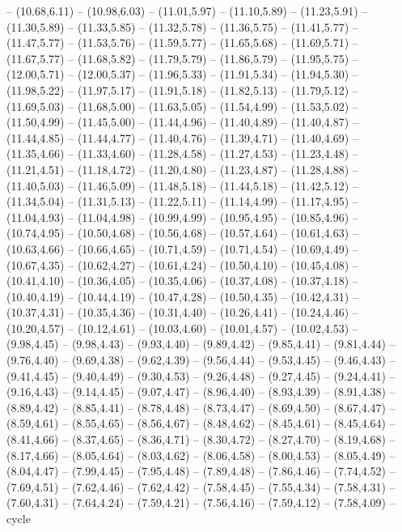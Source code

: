 {-- (10.68,6.11) -- (10.98,6.03) -- (11.01,5.97) -- (11.10,5.89) -- (11.23,5.91) -- (11.30,5.89) -- (11.33,5.85) -- (11.32,5.78) -- (11.36,5.75) -- (11.41,5.77) -- (11.47,5.77) -- (11.53,5.76) -- (11.59,5.77) -- (11.65,5.68) -- (11.69,5.71) -- (11.67,5.77) -- (11.68,5.82) -- (11.79,5.79) -- (11.86,5.79) -- (11.95,5.75) -- (12.00,5.71) -- (12.00,5.37) -- (11.96,5.33) -- (11.91,5.34) -- (11.94,5.30) -- (11.98,5.22) -- (11.97,5.17) -- (11.91,5.18) -- (11.82,5.13) -- (11.79,5.12) -- (11.69,5.03) -- (11.68,5.00) -- (11.63,5.05) -- (11.54,4.99) -- (11.53,5.02) -- (11.50,4.99) -- (11.45,5.00) -- (11.44,4.96) -- (11.40,4.89) -- (11.40,4.87) -- (11.44,4.85) -- (11.44,4.77) -- (11.40,4.76) -- (11.39,4.71) -- (11.40,4.69) -- (11.35,4.66) -- (11.33,4.60) -- (11.28,4.58) -- (11.27,4.53) -- (11.23,4.48) -- (11.21,4.51) -- (11.18,4.72) -- (11.20,4.80) -- (11.23,4.87) -- (11.28,4.88) -- (11.40,5.03) -- (11.46,5.09) -- (11.48,5.18) -- (11.44,5.18) -- (11.42,5.12) -- (11.34,5.04) -- (11.31,5.13) -- (11.22,5.11) -- (11.14,4.99) -- (11.17,4.95) -- (11.04,4.93) -- (11.04,4.98) -- (10.99,4.99) -- (10.95,4.95) -- (10.85,4.96) -- (10.74,4.95) -- (10.50,4.68) -- (10.56,4.68) -- (10.57,4.64) -- (10.61,4.63) -- (10.63,4.66) -- (10.66,4.65) -- (10.71,4.59) -- (10.71,4.54) -- (10.69,4.49) -- (10.67,4.35) -- (10.62,4.27) -- (10.61,4.24) -- (10.50,4.10) -- (10.45,4.08) -- (10.41,4.10) -- (10.36,4.05) -- (10.35,4.06) -- (10.37,4.08) -- (10.37,4.18) -- (10.40,4.19) -- (10.44,4.19) -- (10.47,4.28) -- (10.50,4.35) -- (10.42,4.31) -- (10.37,4.31) -- (10.35,4.36) -- (10.31,4.40) -- (10.26,4.41) -- (10.24,4.46) -- (10.20,4.57) -- (10.12,4.61) -- (10.03,4.60) -- (10.01,4.57) -- (10.02,4.53) -- (9.98,4.45) -- (9.98,4.43) -- (9.93,4.40) -- (9.89,4.42) -- (9.85,4.41) -- (9.81,4.44) -- (9.76,4.40) -- (9.69,4.38) -- (9.62,4.39) -- (9.56,4.44) -- (9.53,4.45) -- (9.46,4.43) -- (9.41,4.45) -- (9.40,4.49) -- (9.30,4.53) -- (9.26,4.48) -- (9.27,4.45) -- (9.24,4.41) -- (9.16,4.43) -- (9.14,4.45) -- (9.07,4.47) -- (8.96,4.40) -- (8.93,4.39) -- (8.91,4.38) -- (8.89,4.42) -- (8.85,4.41) -- (8.78,4.48) -- (8.73,4.47) -- (8.69,4.50) -- (8.67,4.47) -- (8.59,4.61) -- (8.55,4.65) -- (8.56,4.67) -- (8.48,4.62) -- (8.45,4.61) -- (8.45,4.64) -- (8.41,4.66) -- (8.37,4.65) -- (8.36,4.71) -- (8.30,4.72) -- (8.27,4.70) -- (8.19,4.68) -- (8.17,4.66) -- (8.05,4.64) -- (8.03,4.62) -- (8.06,4.58) -- (8.00,4.53) -- (8.05,4.49) -- (8.04,4.47) -- (7.99,4.45) -- (7.95,4.48) -- (7.89,4.48) -- (7.86,4.46) -- (7.74,4.52) -- (7.69,4.51) -- (7.62,4.46) -- (7.62,4.42) -- (7.58,4.45) -- (7.55,4.34) -- (7.58,4.31) -- (7.60,4.31) -- (7.64,4.24) -- (7.59,4.21) -- (7.56,4.16) -- (7.59,4.12) -- (7.58,4.09) -- cycle
}
